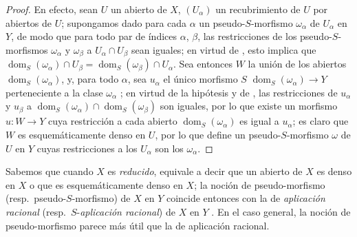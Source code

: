 \begin{proof}
En efecto, sean $U$ un abierto de $X$, $(U_\alpha)$ un recubrimiento de $U$ por abiertos de $U$; supongamos dado para cada $\alpha$ un pseudo-$S$-morfismo $\omega_\alpha$ de $U_\alpha$ en $Y$, de modo que para todo par de índices $\alpha$, $\beta$, las restricciones  de los pseudo-$S$-morfismos $\omega_\alpha$ y $\omega_\beta$ a $U_\alpha\cap U_\beta$ sean iguales; en virtud de , esto implica que $\operatorname{dom}_S(\omega_\alpha)\cap U_\beta=\operatorname{dom}_S(\omega_\beta)\cap U_\alpha$.
Sea entonces $W$ la unión de los abiertos $\operatorname{dom}_S(\omega_\alpha)$, y, para todo $\alpha$, sea $u_\alpha$ el único morfismo $S$ $\operatorname{dom}_S(\omega_\alpha)\to Y$ perteneciente a la clase $\omega_\alpha$ ; en virtud de la hipótesis y de , las restricciones de $u_\alpha$ y $u_\beta$ a $\operatorname{dom}_S(\omega_\alpha)\cap\operatorname{dom}_S(\omega_\beta)$ son iguales, por lo que existe un morfismo $u:W\to Y$ cuya restricción a cada abierto $\operatorname{dom}_S(\omega_\alpha)$ es igual a $u_\alpha$; es claro que $W$ es esquemáticamente denso en $U$, por lo que define un pseudo-$S$-morfismo $\omega$ de $U$ en $Y$ cuyas restricciones a los $U_\alpha$ son los $\omega_\alpha$.
\end{proof}

\begin{remark}[20.2.7]
\label{IV.20.2.7}
Sabemos  que cuando $X$ es \emph{reducido}, equivale a decir que un abierto de $X$ es denso en $X$ o que es esquemáticamente denso en $X$; la noción de pseudo-morfismo (resp.\ pseudo-$S$-morfismo) de $X$ en $Y$ coincide entonces con la de \emph{aplicación racional} (resp.\ $S$-\emph{aplicación racional}) de $X$ en $Y$ .
En el caso general, la noción de pseudo-morfismo parece más útil que la de aplicación racional.
\end{remark}

